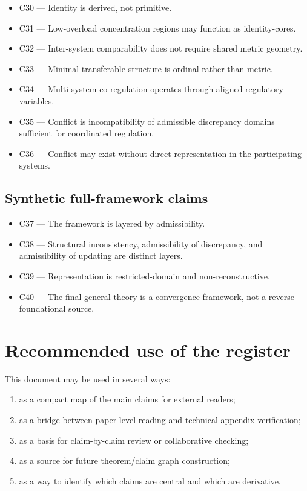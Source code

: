 \documentclass[11pt,a4paper]{article}
\begin{document}
	\begin{itemize}[leftmargin=2em]
		\item C30 --- Identity is derived, not primitive.
		\item C31 --- Low-overload concentration regions may function as identity-cores.
		\item C32 --- Inter-system comparability does not require shared metric geometry.
		\item C33 --- Minimal transferable structure is ordinal rather than metric.
		\item C34 --- Multi-system co-regulation operates through aligned regulatory variables.
		\item C35 --- Conflict is incompatibility of admissible discrepancy domains sufficient for coordinated regulation.
		\item C36 --- Conflict may exist without direct representation in the participating systems.
	\end{itemize}
	
	\subsection{Synthetic full-framework claims}
	
	\begin{itemize}[leftmargin=2em]
		\item C37 --- The framework is layered by admissibility.
		\item C38 --- Structural inconsistency, admissibility of discrepancy, and admissibility of updating are distinct layers.
		\item C39 --- Representation is restricted-domain and non-reconstructive.
		\item C40 --- The final general theory is a convergence framework, not a reverse foundational source.
	\end{itemize}
	
	\section{Recommended use of the register}
	
	This document may be used in several ways:
	
	\begin{enumerate}[leftmargin=2em]
		\item as a compact map of the main claims for external readers;
		\item as a bridge between paper-level reading and technical appendix verification;
		\item as a basis for claim-by-claim review or collaborative checking;
		\item as a source for future theorem/claim graph construction;
		\item as a way to identify which claims are central and which are derivative.
	\end{enumerate}
	
\end{document}
